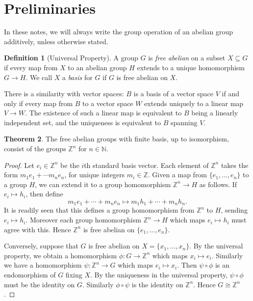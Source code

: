 \documentclass[12pt,a4paper,answers]{exam}
\newcommand{\N}{\mathbb{N}}
\newcommand{\Z}{\mathbb{Z}}
\theoremstyle{definition}
\newtheorem{theorem}{Theorem}[section]
\newtheorem{definition}[theorem]{Definition}
\begin{document}
\section{Preliminaries}

In these notes, we will always write the group operation of an abelian group additively, unless otherwise stated. 

\begin{definition}[Universal Property]
  A group $G$ is \emph{free abelian} on a subset $X\subseteq G$ if every map from $X$ to an abelian group $H$ extends to a unique homomorphism $G\to H$. We call $X$ a \emph{basis} for $G$ if $G$ is free abelian on $X$.
\end{definition}

There is a similarity with vector spaces: $B$ is a basis of a vector space $V$ if and only if every map from $B$ to a vector space $W$ extends uniquely to a linear map $V\to W$. The existence of such a linear map is equivalent to $B$ being a linearly independent set, and the uniqueness is equivalent to $B$ spanning $V$.


\begin{theorem}
  The free abelian groups with finite basis, up to isomorphism, consist of the groups $\Z^n$ for $n\in\N$.
\end{theorem}

\begin{proof}
  Let $e_i\in\Z^n$ be the $i$th standard basis vector. Each element of $\Z^n$ takes the form $m_1e_1+\cdots m_ne_n$, for unique integers $m_i\in\Z$. Given a map from $\{e_1,\ldots,e_n\}$ to a group $H$, we can extend it to a group homomorphism $\Z^n\to H$ as follows. If $e_i\mapsto h_i$, then define
  \[ m_1e_1 + \cdots + m_ne_n \mapsto m_1h_1 + \cdots + m_nh_n. \]
  It is readily seen that this defines a group homomorphism from $\Z^n$ to $H$, sending $e_i\mapsto h_i$. Moreover each group homomorphism $\Z^n\to H$ which maps $e_i\mapsto h_i$ must agree with this. Hence $\Z^n$ is free abelian on $\{e_1,\ldots,e_n\}$.

  Conversely, suppose that $G$ is free abelian on $X=\{x_1,\ldots,x_n\}$. By the universal property, we obtain a homomorphism $\phi\colon G\to\Z^n$ which maps $x_i\mapsto e_i$. Similarly we have a homomorphism $\psi\colon\Z^n\to G$ which maps $e_i\mapsto x_i$. Then $\psi\circ\phi$ is an endomorphism of $G$ fixing $X$. By the uniqueness in the universal property, $\psi\circ\phi$ must be the identity on $G$. Similarly $\phi\circ\psi$ is the identity on $\Z^n$. Hence $G\cong\Z^n$.
\end{proof}
\end{document}
